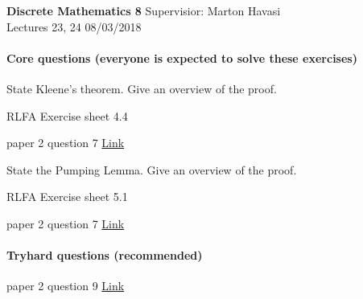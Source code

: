 \documentclass{exam}
\begin{document}
\noindent
\large\textbf{Discrete Mathematics 8} \hfill Supervisior: Marton Havasi \\
\normalsize Lectures 23, 24 \hfill 08/03/2018

\paragraph{Core questions (everyone is expected to solve these exercises)}
\begin{questions}

\question State Kleene's theorem. Give an overview of the proof.

\question RLFA Exercise sheet 4.4

 paper 2 question 7 \href{http://www.cl.cam.ac.uk/teaching/exams/pastpapers/y1999p2q7.pdf}{Link}

\question State the Pumping Lemma. Give an overview of the proof.

\question RLFA Exercise sheet 5.1

 paper 2 question 7 \href{http://www.cl.cam.ac.uk/teaching/exams/pastpapers/y1998p2q7.pdf}{Link}

\end{questions}

\paragraph{Tryhard questions (recommended)}
\begin{questions}

 paper 2 question 9 \href{http://www.cl.cam.ac.uk/teaching/exams/pastpapers/y2004p2q9.pdf}{Link}


\end{questions}
\end{document}
